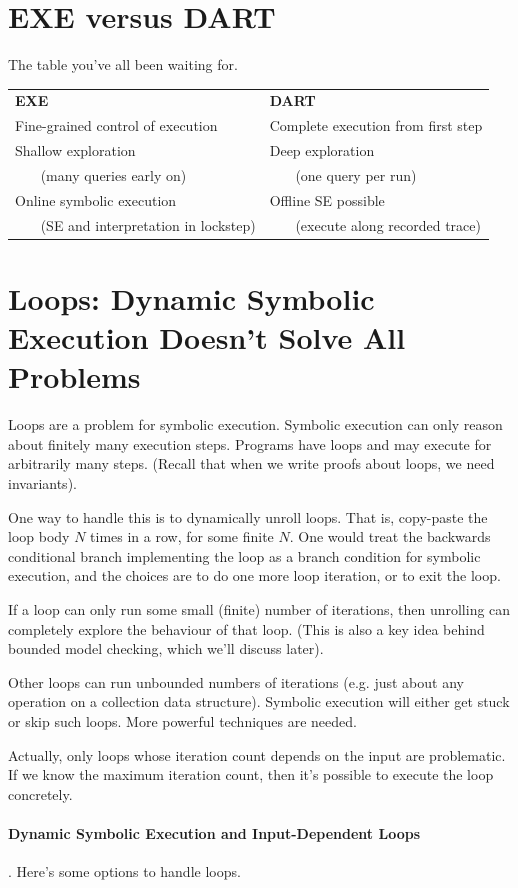 \documentclass[11pt]{article}
\begin{document}
\section{EXE versus DART}
The table you've all been waiting for.

\begin{tabular}{ll}
  \textbf{EXE} & \textbf{DART} \\
  Fine-grained control of execution & Complete execution from first step \\
  Shallow exploration  & Deep exploration  \\
  ~~~ (many queries early on) & ~~~ (one query per run) \\
  Online symbolic execution  & Offline SE possible \\
  ~~~ (SE and interpretation in lockstep) & ~~~  (execute along recorded trace)
\end{tabular}

\section{Loops: Dynamic Symbolic Execution Doesn't Solve All Problems}
Loops are a problem for symbolic execution. Symbolic execution can only reason about finitely many execution steps.
Programs have loops and may execute for arbitrarily many steps.
(Recall that when we write proofs about loops, we need invariants).

One way to handle this is to dynamically unroll loops. That is,
copy-paste the loop body $N$ times in a row, for some finite $N$.  One
would treat the backwards conditional branch implementing the loop as
a branch condition for symbolic execution, and the choices are to do
one more loop iteration, or to exit the loop.

If a loop can only run some small (finite) number of iterations, then
unrolling can completely explore the behaviour of that loop.  (This is
also a key idea behind bounded model checking, which we'll discuss
later).

Other loops can run unbounded numbers of iterations (e.g. just about
any operation on a collection data structure). Symbolic execution will
either get stuck or skip such loops. More powerful techniques are
needed.

Actually, only loops whose iteration count depends on the input are
problematic. If we know the maximum iteration count, then it's
possible to execute the loop concretely.

\paragraph{Dynamic Symbolic Execution and Input-Dependent Loops}. Here's some options to handle loops.
\end{document}
